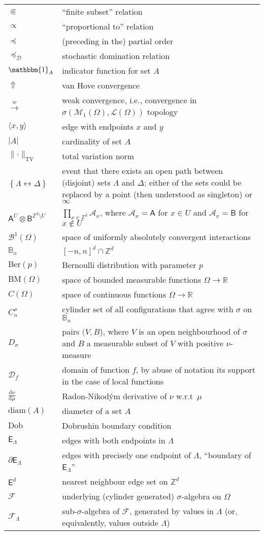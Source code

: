 \documentclass[12pt]{article}
\newcommand{\A}{\mathcal{A}}
\renewcommand{\AA}{\mathsf{A}}
\newcommand{\BB}{\mathscr{B}}
\newcommand{\BBB}{\mathbb{B}}
\newcommand{\AB}{\mathsf{B}}
\newcommand{\D}{\mathcal{D}}
\renewcommand{\d}{\mathrm{d}}
\newcommand{\E}{\mathsf{E}}
\newcommand{\F}{\mathcal{F}}
\newcommand{\Loc}{\mathcal{L}}
\newcommand{\M}{\mathcal{M}}
\newcommand{\R}{\mathbb{R}}
\newcommand{\Z}{\mathbb{Z}}
\newcommand{\BM}{\mathrm{BM}}
\newcommand{\TV}{\mathrm{TV}}
\newcommand{\set}[1]{\left\{#1\right\}}
\newcommand{\ra}{\rightarrow}
\newcommand{\pika}{\boldsymbol{\cdot}}
\newcommand{\1}{\mathbbm{1}}
\renewcommand{\sp}[1]{\langle #1\rangle}
\newcommand{\5}{\vspace{0.5cm}}
\theoremstyle{definition}
\begin{document}
\begin{tabular}{p{4cm}p{10cm}}
$\Subset$ & ``finite subset'' relation \\
$\propto$ & ``proportional to'' relation \\
$\preceq$ & (preceding in the) partial order \\
$\preceq_\D$ & stochastic domination relation \\
$\1_A$ & indicator function for set $A$ \\
$\Uparrow$ & van Hove convergence \\
$\xrightarrow{w}$ & weak convergence, i.e., convergence in $\sigma(\M_1(\Omega),\Loc(\Omega))$ topology \\
$\sp{x,y}$ & edge with endpoints $x$ and $y$ \\
$|A|$ & cardinality of set $A$ \\
$\|\!\pika\!\|_\TV$ & total variation norm \\
$\set{\Lambda\leftrightarrow\Delta}$ & event that there exists an open path between (disjoint) sets $\Lambda$ and $\Delta$; either of the sets could be replaced by a point (then understood as singleton) or $\infty$ \\
$\AA^U\otimes\AB^{\Z^d\setminus U}$ & $\prod_{x\in\Z^d}\A_x$, where $\A_x=\AA$ for $x\in U$ and $\A_x=\AB$ for $x\notin U$ \\
$\BB^1(\Omega)$ & space of uniformly absolutely convergent interactions \\
$\BBB_n$ & $[-n,n]^d\cap\Z^d$ \\
$\mathrm{Ber}(p)$ & Bernoulli distribution with parameter $p$ \\
$\BM(\Omega)$ & space of bounded measurable functions $\Omega\ra\R$ \\
$C(\Omega)$ & space of continuous functions $\Omega\ra\R$ \\
$C_n^\sigma$ & cylinder set of all configurations that agree with $\sigma$ on $\BBB_n$ \\
$D_\sigma$ & pairs $(V,B$), where $V$ is an open neighbourhood of $\sigma$ and $B$ a measurable subset of $V$ with positive $\nu$-measure \\
$\D_f$ & domain of function $f$, by abuse of notation its support in the case of local functions \\
$\frac{\d\nu}{\d\mu}$ & Radon-Nikod\'ym derivative of $\nu$ w.r.t~$\mu$ \\
$\mathrm{diam}(A)$ & diameter of a set $A$ \\
$\mathrm{Dob}$ & Dobrushin boundary condition \\
$\E_\Lambda$ & edges with both endpoints in $\Lambda$ \\
$\partial\E_\Lambda$ & edges with precisely one endpoint of $\Lambda$, ``boundary of $\E_\Lambda$'' \\
$\E^d$ & nearest neighbour edge set on $\Z^d$ \\
$\F$ & underlying (cylinder generated) $\sigma$-algebra on $\Omega$ \\
$\F_\Lambda$ & sub-$\sigma$-algebra of $\F$, generated by values in $\Lambda$ (or, equivalently, values outside $\Lambda$)  
\end{tabular} 
\end{document}
